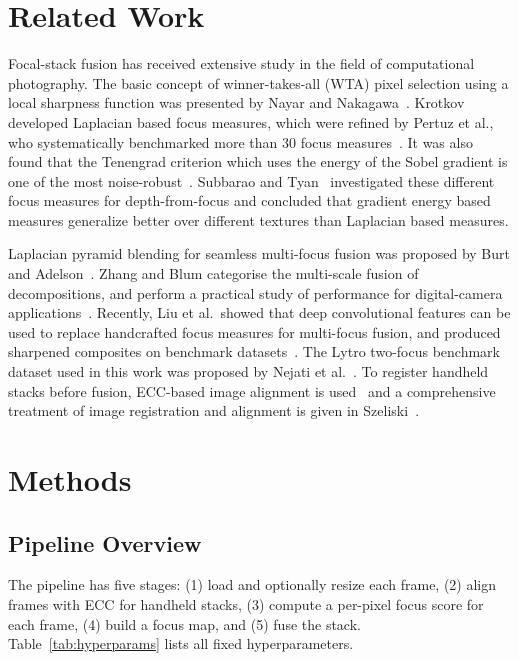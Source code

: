 \documentclass[conference]{IEEEtran}
\begin{document}
\section{Related Work}

Focal-stack fusion has received extensive study in the field of computational photography. The basic concept of winner-takes-all (WTA) pixel selection using a local sharpness function was presented by Nayar and Nakagawa~\cite{nayar1994shape}. Krotkov~\cite{krotkov1988focusing} developed Laplacian based focus measures, which were refined by Pertuz et al., who systematically benchmarked more than 30 focus measures~\cite{pertuz2013analysis}. It was also found that the Tenengrad criterion which uses the energy of the Sobel gradient is one of the most noise-robust~\cite{santos1997evaluation}. Subbarao and Tyan~\cite{subbarao1998optimal} investigated these different focus measures for depth-from-focus and concluded that gradient energy based measures generalize better over different textures than Laplacian based measures.

Laplacian pyramid blending for seamless multi-focus fusion was proposed by Burt and Adelson~\cite{burt1983multiresolution}. Zhang and Blum categorise the multi-scale fusion of decompositions, and perform a practical study of performance for digital-camera applications~\cite{zhang1999categorization}. Recently, Liu et al.\ showed that deep convolutional features can be used to replace handcrafted focus measures for multi-focus fusion, and produced sharpened composites on benchmark datasets~\cite{liu2017multifocus}. The Lytro two-focus benchmark dataset used in this work was proposed by Nejati et al.~\cite{nejati2015multi}. To register handheld stacks before fusion, ECC-based image alignment is used~\cite{evangelidis2008parametric} and a comprehensive treatment of image registration and alignment is given in Szeliski~\cite{szeliski2010}.

\section{Methods}

\subsection{Pipeline Overview}

The pipeline has five stages: (1) load and optionally resize each frame, (2) align frames with ECC for handheld stacks, (3) compute a per-pixel focus score for each frame, (4) build a focus map, and (5) fuse the stack. Table~\ref{tab:hyperparams} lists all fixed hyperparameters.
\end{document}
